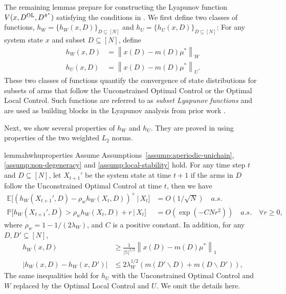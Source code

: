 \documentclass[11pt,letterpaper]{article}
\theoremstyle{plain}
\theoremstyle{definition}
\theoremstyle{remark}
\newcommand{\norm}[1]{\left\lVert#1\right\rVert}
\newcommand{\Ebig}[1]{\mathbb{E}\big[#1\big]}
\newcommand{\givenbig}{\,\big|\,}
\newcommand{\Probbig}[1]{\mathbb{P}\big[#1\big]}
\newcommand{\abs}[1]{\left\lvert#1\right\rvert}
\newcommand{\sspa}{\mathbb{S}}
\newcommand{\pibar}{{\sysbar{\pi}}}
\newcommand{\pibs}{{\pibar^*}}
\newcommand{\sysbar}[1]{\bar{#1}}
\newcommand{\statdist}{\mu^*}
\newcommand{\wmat}{W}
\newcommand{\umat}{U}
\newcommand{\hw}{h_\wmat}
\newcommand{\hu}{h_\umat}
\newcommand{\lamw}{\lambda_\wmat}
\newcommand{\rhow}{\rho_{w}}
\newcommand{\Da}{D^{\pibs}}
\newcommand{\Db}{D^{\textup{OL}}}
\begin{document}
The remaining lemmas prepare for constructing the Lyapunov function $V(x, \Db, \Da)$ satisfying the conditions in . 
We first define two classes of functions, $\hw=\{\hw(x, D)\}_{D\subseteq [N]}$ and $\hu=\{\hu(x, D)\}_{D\subseteq [N]}$: 
For any system state $x$ and subset $D\subseteq[N]$, define
\begin{align}
    \label{eq:hw-def}
    \hw(x, D) &= \norm{x(D) - m(D)\statdist}_\wmat \\
    \label{eq:hu-def}
    \hu(x, D) &= \norm{x(D) - m(D)\statdist}_\umat.
\end{align}
These two classes of functions quantify the convergence of state distributions for subsets of arms that follow the Unconstrained Optimal Control or the Optimal Local Control. Such functions are referred to as \emph{subset Lyapunov functions} and are used as building blocks in the Lyapunov analysis from prior work \citep{HonXieCheWan_24}. 

Next, we show several properties of $\hw$ and $\hu$. They are proved in  using properties of the two weighted $L_2$ norms. 

\begin{restatable}[Properties of $\hw$ and $\hu$]{lemma}{hwhuproperties}\label{lem:hw-hu-properties}
    Assume Assumptions~\ref{assump:aperiodic-unichain}, \ref{assump:non-degeneracy} and \ref{assump:local-stability} hold. 
    For any time step $t$ and $D\subseteq [N]$, let $X_{t+1}'$ be the system state at time $t+1$ if the arms in $D$ follow the Unconstrained Optimal Control at time $t$, then we have
    \begin{align}
        \label{eq:hw:drift}
        \Ebig{(\hw(X_{t+1}', D) - \rhow \hw(X_t, D))^+ \givenbig X_t} &= O(1/\sqrt{N}) \quad a.s. \\
        \label{eq:hw:high-prob}
        \Probbig{\hw(X_{t+1}', D) > \rhow \hw(X_t, D) + r   \givenbig X_t} &= O(\exp(-C N r^2)) \quad a.s. \quad \forall r \geq 0,
    \end{align}
    where $\rhow = 1 - 1/(2\lamw)$, and $C$ is a positive constant. 
    In addition, for any $D, D'\subseteq [N]$, 
    \begin{align}
        \label{eq:hw:strength}
        \hw(x, D) &\geq \frac{1}{|\sspa|^{1/2}} \norm{x(D) - m(D)\statdist}_1 \\
        \label{eq:hw:lipschitz}
        \abs{\hw(x, D) - \hw(x, D')} &\leq 2\lamw^{1/2} (m(D'\backslash D) + m(D\backslash D')),
    \end{align}
    The same inequalities hold for $\hu$ with the Unconstrained Optimal Control and $W$ replaced by the Optimal Local Control and $U$. We omit the details here. 
\end{restatable}
\end{document}
